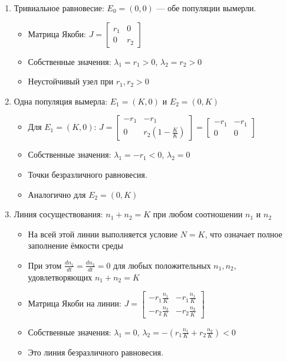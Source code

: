 \documentclass[a4paper, 14pt]{extarticle}
\begin{document}
\begin{enumerate}
\item Тривиальное равновесие: \(E_0 = (0, 0)\) — обе популяции вымерли. 
\begin{itemize}
\item Матрица Якоби: \(J = \begin{bmatrix} r_1 & 0 \\ 0 & r_2 \end{bmatrix}\)
\item Собственные значения: \(\lambda_1 = r_1 > 0\), \(\lambda_2 = r_2 > 0\)
\item Неустойчивый узел при \(r_1, r_2 > 0\)
\end{itemize}

\item Одна популяция вымерла: \(E_1 = (K, 0)\) и \(E_2 = (0, K)\)
\begin{itemize}
\item Для \(E_1 = (K, 0)\): \(J = \begin{bmatrix} -r_1 & -r_1 \\ 0 & r_2(1-\frac{K}{K}) \end{bmatrix} = \begin{bmatrix} -r_1 & -r_1 \\ 0 & 0 \end{bmatrix}\)
\item Собственные значения: \(\lambda_1 = -r_1 < 0\), \(\lambda_2 = 0\)
\item Точки безразличного равновесия.
\item Аналогично для \(E_2 = (0, K)\)
\end{itemize}

\item Линия сосуществования: \(n_1 + n_2 = K\) при любом соотношении $n_1$ и $n_2$
\begin{itemize}
\item На всей этой линии выполняется условие $N = K$, что означает полное заполнение ёмкости среды
\item При этом $\frac{dn_1}{dt} = \frac{dn_2}{dt} = 0$ для любых положительных $n_1, n_2$, удовлетворяющих $n_1 + n_2 = K$
\item Матрица Якоби на линии: \(J = \begin{bmatrix} -r_1\frac{n_1}{K} & -r_1\frac{n_1}{K} \\ -r_2\frac{n_2}{K} & -r_2\frac{n_2}{K} \end{bmatrix}\)
\item Собственные значения: \(\lambda_1 = 0\), \(\lambda_2 = -(r_1\frac{n_1}{K} + r_2\frac{n_2}{K}) < 0\)
\item Это линия безразличного равновесия.
\end{itemize}
\end{enumerate}
\end{document}
